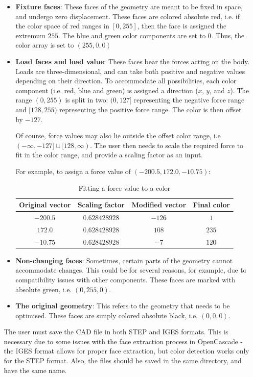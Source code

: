 \begin{itemize}
	\item \textbf{Fixture faces}: These faces of the geometry are meant to be fixed in space, and undergo zero displacement. These faces are colored absolute red, i.e. if the color space of red ranges in {$[0, 255]$}, then the face is assigned the extremum $255$. The blue and green color components are set to $0$. Thus, the color array is set to $(255, 0, 0)$
	\item \textbf{Load faces and load value}: These faces bear the forces acting on the body. Loads are three-dimensional, and can take both positive and negative values depending on their direction. To accommodate all possibilities, each color component (i.e. red, blue and green) is assigned a direction ($x$, $y$, and $z$). The range $(0, 255)$ is split in two: $(0, 127]$ representing the negative force range and $[128, 255)$ representing the positive force range. The color is then offset by $-127$. 

Of course, force values may also lie outside the offset color range, i.e $(-\infty, -127] \cup [128, \infty)$. The user then needs to scale the required force to fit in the color range, and provide a scaling factor as an input.

For example, to assign a force value of $(-200.5, 172.0, -10.75)$:

\begin{table}[h!]
	\begin{center}
		\caption{Fitting a force value to a color}
		\label{LoadFaceExample}
		\begin{tabular}{cccc}
			\toprule
			{\small Original vector} & {\small Scaling factor} & {\small Modified vector} & {\small Final color}\\
			\midrule
			$-200.5$ & $0.628428928$ & $-126$ & $1$\\
			$172.0$  & $0.628428928$ & $108$  & $235$\\
			$-10.75$ & $0.628428928$ & $-7$   & $120$\\
			\bottomrule
		\end{tabular}
	\end{center}
\end{table}
	\item \textbf{Non-changing faces}: Sometimes, certain parts of the geometry cannot accommodate changes. This could be for several reasons, for example, due to compatibility issues with other components. These faces are marked with absolute green, i.e. $(0, 255, 0)$.
	\item \textbf{The original geometry}: This refers to the geometry that needs to be optimised. These faces are simply colored absolute black, i.e. $(0, 0, 0)$.
\end{itemize}

The user must save the CAD file in both STEP and IGES formats. This is necessary due to some issues with the face extraction process in OpenCascade - the IGES format allows for proper face extraction, but color detection works only for the STEP format. Also, the files should be saved in the same directory, and have the same name.

